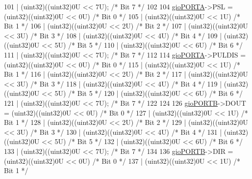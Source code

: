 \begin{DoxyCode}
101                    | (uint32)((uint32)0U << 7U); \textcolor{comment}{/* Bit 7 */}
102 
104     \mbox{\hyperlink{reg__gio_8h_ae20775a37d510c0bd217a9f75c90a574}{gioPORTA}}->PSL  = (uint32)((uint32)0U << 0U)  \textcolor{comment}{/* Bit 0 */}
105                    | (uint32)((uint32)0U << 1U)  \textcolor{comment}{/* Bit 1 */}
106                    | (uint32)((uint32)0U << 2U)  \textcolor{comment}{/* Bit 2 */}
107                    | (uint32)((uint32)0U << 3U)  \textcolor{comment}{/* Bit 3 */}
108                    | (uint32)((uint32)0U << 4U)  \textcolor{comment}{/* Bit 4 */}
109                    | (uint32)((uint32)0U << 5U)  \textcolor{comment}{/* Bit 5 */}
110                    | (uint32)((uint32)0U << 6U)  \textcolor{comment}{/* Bit 6 */}
111                    | (uint32)((uint32)0U << 7U); \textcolor{comment}{/* Bit 7 */}
112 
114     \mbox{\hyperlink{reg__gio_8h_ae20775a37d510c0bd217a9f75c90a574}{gioPORTA}}->PULDIS  = (uint32)((uint32)0U << 0U)  \textcolor{comment}{/* Bit 0 */}
115                       | (uint32)((uint32)0U << 1U)  \textcolor{comment}{/* Bit 1 */}
116                       | (uint32)((uint32)0U << 2U)  \textcolor{comment}{/* Bit 2 */}
117                       | (uint32)((uint32)0U << 3U)  \textcolor{comment}{/* Bit 3 */}
118                       | (uint32)((uint32)0U << 4U)  \textcolor{comment}{/* Bit 4 */}
119                       | (uint32)((uint32)0U << 5U)  \textcolor{comment}{/* Bit 5 */}
120                       | (uint32)((uint32)0U << 6U)  \textcolor{comment}{/* Bit 6 */}
121                       | (uint32)((uint32)0U << 7U); \textcolor{comment}{/* Bit 7 */}
122 
124 
126     \mbox{\hyperlink{reg__gio_8h_af0da6a4cad272dcfc7922ff5a5fc30cb}{gioPORTB}}->DOUT = (uint32)((uint32)0U << 0U)  \textcolor{comment}{/* Bit 0 */}
127                    | (uint32)((uint32)0U << 1U)  \textcolor{comment}{/* Bit 1 */}
128                    | (uint32)((uint32)0U << 2U)  \textcolor{comment}{/* Bit 2 */}
129                    | (uint32)((uint32)0U << 3U)  \textcolor{comment}{/* Bit 3 */}
130                    | (uint32)((uint32)0U << 4U)  \textcolor{comment}{/* Bit 4 */}
131                    | (uint32)((uint32)0U << 5U)  \textcolor{comment}{/* Bit 5 */}
132                    | (uint32)((uint32)0U << 6U)  \textcolor{comment}{/* Bit 6 */}
133                    | (uint32)((uint32)0U << 7U); \textcolor{comment}{/* Bit 7 */}
134 
136     \mbox{\hyperlink{reg__gio_8h_af0da6a4cad272dcfc7922ff5a5fc30cb}{gioPORTB}}->DIR  = (uint32)((uint32)0U << 0U)  \textcolor{comment}{/* Bit 0 */}
137                    | (uint32)((uint32)0U << 1U)  \textcolor{comment}{/* Bit 1 */}

\end{DoxyCode}
